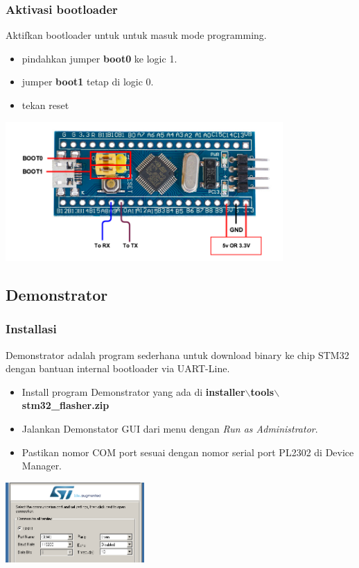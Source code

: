 \documentclass[table,dvipsnames]{beamer}
\begin{document}
	\begin{frame}
		\frametitle{Aktivasi bootloader}
		\begin{block}{}
			Aktifkan bootloader untuk untuk masuk mode programming.
			\begin{itemize}
				\item pindahkan jumper \textbf{boot0} ke logic 1.
				\item jumper \textbf{boot1} tetap di logic 0.
				\item tekan reset
			\end{itemize}
		\end{block}
		
		\begin{center}
			\includegraphics[width=300pt]{images/flashing}
		\end{center}
	\end{frame}

	\subsection{Demonstrator}
	\begin{frame}
		\frametitle{Installasi}
		\begin{block}{}
			Demonstrator adalah program sederhana untuk download binary ke chip STM32 dengan bantuan internal bootloader via UART-Line.
			\begin{itemize}
				\item Install program Demonstrator yang ada di \textbf{installer$\backslash$tools$\backslash$stm32\_flasher.zip}
				\item Jalankan Demonstator GUI dari menu dengan \textit{Run as Administrator}.
				\item Pastikan nomor COM port sesuai dengan nomor serial port PL2302 di Device Manager.
			\end{itemize}
		\end{block}
		
		\begin{center}
			\includegraphics[width=150pt]{images/demons}
		\end{center}
	\end{frame}
\end{document}
